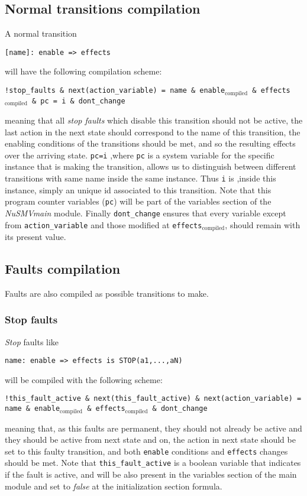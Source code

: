 \documentclass[12pt]{article}
\newcommand{\nusmv}{\mbox{\textit{NuSMV}}}
\newcommand{\textusc}[1]{$_{\text{#1}}$} %
\begin{document}
\subsection{Normal transitions compilation}
A normal transition
\begin{center}
\texttt{[name]: enable => effects}
\end{center}
will have the following compilation scheme:
\begin{center}
\texttt{!stop\_faults \& next(action\_variable) = name \& enable\textusc{compiled} \& effects\textusc{compiled} \& pc = i \& dont\_change}
\end{center}
meaning that all \textit{stop faults} which disable this transition should not be active, the last action in the next state should correspond to the name of this transition, the enabling conditions of the transitions should be met, and so the resulting effects over the arriving state. \texttt{pc=i} ,where \texttt{pc} is a system variable for the specific instance that is making the transition, allows us to distinguish between different transitions with same name inside the same instance. Thus \texttt{i} is ,inside this instance, simply an unique id associated to this transition. Note that this program counter variables (\texttt{pc}) will be part of the variables section of the \nusmv \textit{main} module. Finally \texttt{dont\_change} ensures that every variable except from \texttt{action\_variable} and those modified at \texttt{effects\textusc{compiled}}, should remain with its present value. 
\subsection{Faults compilation}
Faults are also compiled as possible transitions to make.
\subsubsection*{Stop faults}
\textit{Stop} faults like
\begin{center}
\texttt{name: enable => effects is STOP(a1,...,aN)}
\end{center}
will be compiled with the following scheme:
\begin{center}
\texttt{!this\_fault\_active \& next(this\_fault\_active) \& next(action\_variable) = name \& enable\textusc{compiled} \& effects\textusc{compiled} \& dont\_change }
\end{center}
meaning that, as this faults are permanent, they should not already be active and they should be active from next state and on, the action in next state should be set to this faulty transition, and both \texttt{enable} conditions and \texttt{effects} changes should be met. Note that \texttt{this\_fault\_active} is a boolean variable that indicates if the fault is active, and will be also present in the variables section of the main module and set to \textit{false} at the initialization section formula.
\end{document}
